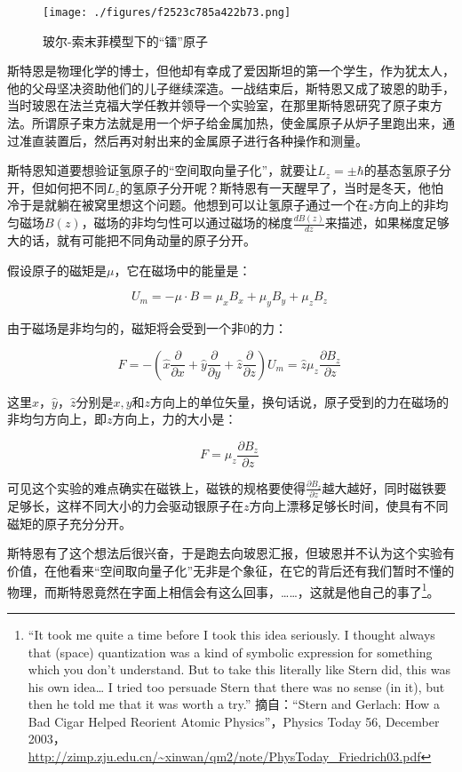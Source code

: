 \begin{figure}[ht]
\centering
\texttt{[image: ./figures/f2523c785a422b73.png]}
\caption{玻尔-索末菲模型下的“镭”原子} \label{fig_QMPre2_17}
\end{figure}

斯特恩是物理化学的博士，但他却有幸成了爱因斯坦的第一个学生，作为犹太人，他的父母坚决资助他们的儿子继续深造。一战结束后，斯特恩又成了玻恩的助手，当时玻恩在法兰克福大学任教并领导一个实验室，在那里斯特恩研究了原子束方法。所谓原子束方法就是用一个炉子给金属加热，使金属原子从炉子里跑出来，通过准直装置后，然后再对射出来的金属原子进行各种操作和测量。

斯特恩知道要想验证氢原子的“空间取向量子化”，就要让$L_z = \pm \hbar$的基态氢原子分开，但如何把不同$L_z$的氢原子分开呢？斯特恩有一天醒早了，当时是冬天，他怕冷于是就躺在被窝里想这个问题。他想到可以让氢原子通过一个在$z$方向上的非均匀磁场$B(z)$，磁场的非均匀性可以通过磁场的梯度$\frac{d B(z)}{d z}$来描述，如果梯度足够大的话，就有可能把不同角动量的原子分开。


假设原子的磁矩是$\mu$，它在磁场中的能量是：

\begin{equation}
U_m = - \mu \cdot B = \mu_x B_x + \mu_y B_y + \mu_z B_z ~
\end{equation}

由于磁场是非均匀的，磁矩将会受到一个非0的力：

\begin{equation}
F = - \left( \hat x \frac{\partial }{\partial x} + \hat y \frac{\partial }{\partial y}  + \hat z \frac{\partial }{\partial z}  \right) U_m  = \hat z  \mu_z  \frac{\partial B_z }{\partial z}~
\end{equation}

这里$\hat x $，$\hat y $，$\hat z $分别是$x, y$和$z$方向上的单位矢量，换句话说，原子受到的力在磁场的非均匀方向上，即$z$方向上，力的大小是：

\begin{equation}
F =  \mu_z  \frac{\partial B_z }{\partial z}~
\end{equation}

可见这个实验的难点确实在磁铁上，磁铁的规格要使得$\frac{\partial B_z}{\partial z}$越大越好，同时磁铁要足够长，这样不同大小的力会驱动银原子在$z$方向上漂移足够长时间，使具有不同磁矩的原子充分分开。


斯特恩有了这个想法后很兴奋，于是跑去向玻恩汇报，但玻恩并不认为这个实验有价值，在他看来“空间取向量子化”无非是个象征，在它的背后还有我们暂时不懂的物理，而斯特恩竟然在字面上相信会有这么回事，……，这就是他自己的事了\footnote{“It took me quite a time before I took this idea seriously. I thought always that (space) quantization was a kind of symbolic expression for something which you don’t understand. But to take this literally like Stern did, this was his own idea… I tried too persuade Stern that there was no sense (in it), but then he told me that it was worth a try.” 摘自：“Stern and Gerlach: How a Bad Cigar Helped Reorient Atomic Physics”，Physics Today 56, December 2003， \url{http://zimp.zju.edu.cn/~xinwan/qm2/note/PhysToday_Friedrich03.pdf}}。

